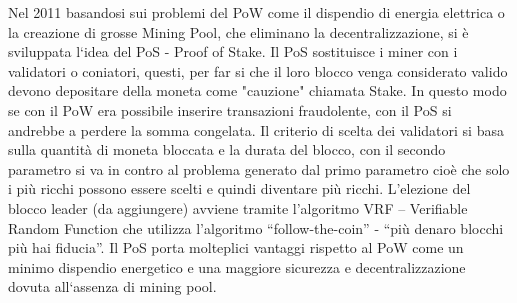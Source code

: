 \documentclass[11pt,a4paper,titlepage]{report}
\begin{document}
Nel 2011 basandosi sui problemi del PoW come il dispendio di energia elettrica o la creazione di grosse Mining Pool, che eliminano la decentralizzazione, si è sviluppata l`idea del PoS - Proof of Stake. Il PoS sostituisce i miner con i validatori o coniatori, questi, per far si che il loro blocco venga considerato valido devono depositare della moneta come "cauzione" chiamata Stake.
In questo modo se con il PoW era possibile inserire transazioni fraudolente, con il PoS si andrebbe a perdere la somma congelata. Il criterio di scelta dei validatori si basa sulla quantità di moneta bloccata e la durata del blocco, con il secondo parametro si va in contro al problema generato dal primo parametro cioè che solo i più ricchi possono essere scelti e quindi diventare più ricchi.
L’elezione del blocco leader (da aggiungere) avviene tramite l’algoritmo VRF – Verifiable Random Function che utilizza l’algoritmo “follow-the-coin” - “più denaro blocchi più hai fiducia”. Il PoS porta molteplici vantaggi rispetto al PoW come un minimo dispendio energetico e una maggiore sicurezza e decentralizzazione dovuta all`assenza di mining pool.
\end{document}
